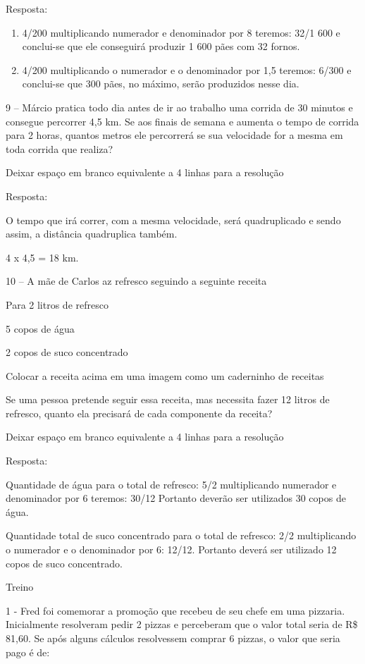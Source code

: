 Resposta:

\begin{enumerate}
\def\labelenumi{\alph{enumi})}
\item
  4/200 multiplicando numerador e denominador por 8 teremos: 32/1 600 e
  conclui-se que ele conseguirá produzir 1 600 pães com 32 fornos.
\item
  4/200 multiplicando o numerador e o denominador por 1,5 teremos: 6/300
  e conclui-se que 300 pães, no máximo, serão produzidos nesse dia.
\end{enumerate}

9 -- Márcio pratica todo dia antes de ir ao trabalho uma corrida de 30
minutos e consegue percorrer 4,5 km. Se aos finais de semana e aumenta o
tempo de corrida para 2 horas, quantos metros ele percorrerá se sua
velocidade for a mesma em toda corrida que realiza?

Deixar espaço em branco equivalente a 4 linhas para a resolução

Resposta:

O tempo que irá correr, com a mesma velocidade, será quadruplicado e
sendo assim, a distância quadruplica também.

4 x 4,5 = 18 km.

10 -- A mãe de Carlos az refresco seguindo a seguinte receita

Para 2 litros de refresco

5 copos de água

2 copos de suco concentrado

Colocar a receita acima em uma imagem como um caderninho de receitas

Se uma pessoa pretende seguir essa receita, mas necessita fazer 12
litros de refresco, quanto ela precisará de cada componente da receita?

Deixar espaço em branco equivalente a 4 linhas para a resolução

Resposta:

Quantidade de água para o total de refresco: 5/2 multiplicando numerador
e denominador por 6 teremos: 30/12 Portanto deverão ser utilizados 30
copos de água.

Quantidade total de suco concentrado para o total de refresco: 2/2
multiplicando o numerador e o denominador por 6: 12/12. Portanto deverá
ser utilizado 12 copos de suco concentrado.

Treino

1 - Fred foi comemorar a promoção que recebeu de seu chefe em uma
pizzaria. Inicialmente resolveram pedir 2 pizzas e perceberam que o
valor total seria de R\$ 81,60. Se após alguns cálculos resolvessem
comprar 6 pizzas, o valor que seria pago é de:

